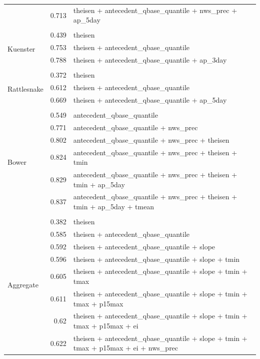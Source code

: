 \documentclass[10pt]{article}
\begin{document}
\begin{table}[h]
\begin{center}
\begin{tabular}{lrl}
 & 0.713 & theisen + antecedent\_qbase\_quantile + nws\_prec + ap\_5day\\ 
\vspace{2mm}\\ \multirow{4}{*}{Kuenster} & 0.439 & theisen\\ 
 & 0.753 & theisen + antecedent\_qbase\_quantile\\ 
 & 0.788 & theisen + antecedent\_qbase\_quantile + ap\_3day\\ 
\vspace{2mm}\\ \multirow{4}{*}{Rattlesnake} & 0.372 & theisen\\ 
 & 0.612 & theisen + antecedent\_qbase\_quantile\\ 
 & 0.669 & theisen + antecedent\_qbase\_quantile + ap\_5day\\ 
\vspace{2mm}\\ \multirow{7}{*}{Bower} & 0.549 & antecedent\_qbase\_quantile\\ 
 & 0.771 & antecedent\_qbase\_quantile + nws\_prec\\ 
 & 0.802 & antecedent\_qbase\_quantile + nws\_prec + theisen\\ 
 & 0.824 & antecedent\_qbase\_quantile + nws\_prec + theisen + tmin\\ 
 & 0.829 & antecedent\_qbase\_quantile + nws\_prec + theisen + tmin + ap\_5day\\ 
 & 0.837 & antecedent\_qbase\_quantile + nws\_prec + theisen + tmin + ap\_5day + tmean\\ 
\vspace{2mm}\\ \multirow{11}{*}{Aggregate} & 0.382 & theisen\\ 
 & 0.585 & theisen + antecedent\_qbase\_quantile\\ 
 & 0.592 & theisen + antecedent\_qbase\_quantile + slope\\ 
 & 0.596 & theisen + antecedent\_qbase\_quantile + slope + tmin\\ 
 & 0.605 & theisen + antecedent\_qbase\_quantile + slope + tmin + tmax\\ 
 & 0.611 & theisen + antecedent\_qbase\_quantile + slope + tmin + tmax + p15max\\ 
 & 0.62 & theisen + antecedent\_qbase\_quantile + slope + tmin + tmax + p15max + ei\\ 
 & 0.622 & theisen + antecedent\_qbase\_quantile + slope + tmin + tmax + p15max + ei + nws\_prec\\ 

\end{tabular}
\end{center}
\end{table}
\end{document}
